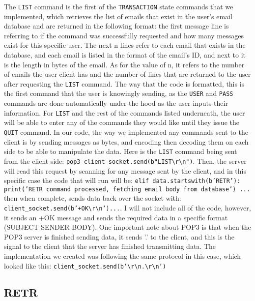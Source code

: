 \documentclass[12pt]{article}
\begin{document}
The \texttt{LIST} command is the first of the \texttt{TRANSACTION} state commands that we implemented, which retrieves the list of emails that exist in the user's email database and are returned in the following format: the first message line is referring to if the command was successfully requested and how many messages exist for this specific user. The next n lines refer to each email that exists in the database, and each email is listed in the format of the email’s ID, and next to it is the length in bytes of the email. As for the value of n, it refers to the number of emails the user client has and the number of lines that are returned to the user after requesting the \texttt{LIST} command. The way that the code is formatted, this is the first command that the user is knowingly sending, as the \texttt{USER} and \texttt{PASS} commands are done automatically under the hood as the user inputs their information. For \texttt{LIST} and the rest of the commands listed underneath, the user will be able to enter any of the commands they would like until they issue the \texttt{QUIT} command. In our code, the way we implemented any commands sent to the client is by sending messages as bytes, and encoding then decoding them on each side to be able to manipulate the data. Here is the \texttt{LIST} command being sent from the client side: \texttt{pop3\_client\_socket.send(b"LIST\textbackslash r\textbackslash n")}. Then, the server will read this request by scanning for any message sent by the client, and in this specific case the code that will run will be: \texttt{elif data.startswith(b'RETR'): print('RETR command processed, fetching email body from database') ...} then when complete, sends data back over the socket with: \texttt{client\_socket.send(b'+OK\textbackslash r\textbackslash n')...}. I will not include all of the code, however, it sends an +OK message and sends the required data in a specific format (SUBJECT SENDER BODY). One important note about POP3 is that when the POP3 server is finished sending data, it sends '.' to the client, and this is the signal to the client that the server has finished transmitting data. The implementation we created was following the same protocol in this case, which looked like this: \texttt{client\_socket.send(b'\textbackslash r\textbackslash n.\textbackslash r\textbackslash n')}

\subsection{RETR}
\end{document}
